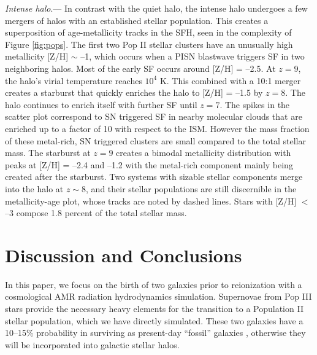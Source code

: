 \documentclass[12pt]{article}
\newcommand\tento[1]{$10^{#1}$}
\begin{document}
\textit{Intense halo}.--- In contrast with the quiet halo, the intense
halo undergoes a few mergers of halos with an established stellar
population.  This creates a superposition of age-metallicity tracks in
the SFH, seen in the complexity of Figure \ref{fig:pops}.  The first
two Pop II stellar clusters have an unusually high metallicity [Z/H]
$\sim$ --1, which occurs when a PISN blastwave triggers SF in two
neighboring halos.  Most of the early SF occurs around [Z/H] = --2.5.
At $z=9$, the halo's virial temperature reaches \tento{4} K.  This
combined with a 10:1 merger creates a starburst that quickly enriches
the halo to [Z/H] = --1.5 by $z=8$.  The halo continues to enrich
itself with further SF until $z=7$.  The spikes in the scatter plot
correspond to SN triggered SF in nearby molecular clouds
that are enriched up to a factor of 10 with respect to the ISM.
However the mass fraction of these metal-rich, SN triggered clusters
are small compared to the total stellar mass.  The starburst at $z=9$
creates a bimodal metallicity distribution with peaks at [Z/H] = --2.4
and --1.2 with the metal-rich component mainly being created after the
starburst.  Two systems with sizable stellar components merge into the
halo at $z \sim 8$, and their stellar populations are still
discernible in the metallicity-age plot, whose tracks are noted by
dashed lines.  Stars with [Z/H] $<$ --3 compose 1.8 percent of the
total stellar mass.

\section*{Discussion and Conclusions}

In this paper, we focus on the birth of two galaxies prior to
reionization with a cosmological AMR radiation hydrodynamics
simulation.  Supernovae from Pop III stars provide the necessary heavy
elements for the transition to a Population II stellar population,
which we have directly simulated.  These two galaxies have a 10--15\%
probability in surviving as present-day ``fossil'' galaxies
\cite{Gnedin06}, otherwise they will be incorporated into galactic
stellar halos.  
\end{document}
